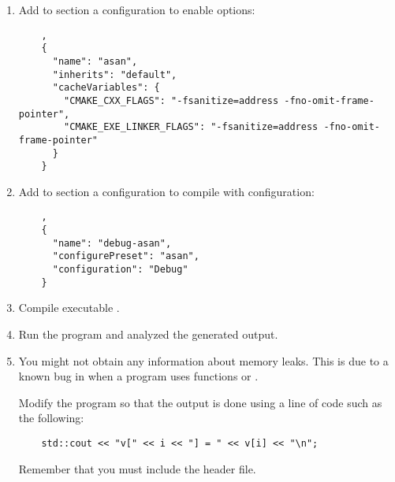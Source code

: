 \begin{enumerate}

\item 
Add to section  
a configuration to enable 
options:

\begin{lstlisting}
    ,
    {
      "name": "asan",
      "inherits": "default",
      "cacheVariables": {
        "CMAKE_CXX_FLAGS": "-fsanitize=address -fno-omit-frame-pointer",
        "CMAKE_EXE_LINKER_FLAGS": "-fsanitize=address -fno-omit-frame-pointer"
      }
    }
\end{lstlisting}

\item 
Add to section 
a configuration to compile with 
configuration:

\begin{lstlisting}
    ,
    {
      "name": "debug-asan",
      "configurePreset": "asan",
      "configuration": "Debug"
    }
\end{lstlisting}

\item
Compile executable 
.

\item
Run the program and analyzed the generated output.

\item
You might not obtain any information about memory leaks. This is due to a
known bug in  when a program uses functions
 or .

Modify the program so that the output is done using a line of code such as the
following:

\begin{lstlisting}
    std::cout << "v[" << i << "] = " << v[i] << "\n";
\end{lstlisting}

Remember that you must include the  header file.

\end{enumerate}

